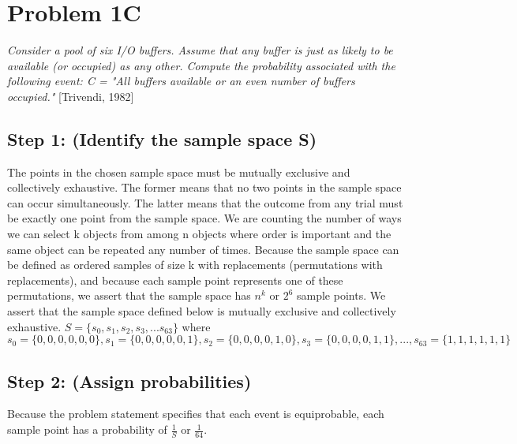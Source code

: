 \documentclass[a4paper,10pt]{article}
\title{}
\author{Mark Johnson \\
Loyola University Chicago}
\date {mjohnson4@luc.edu}
\begin{document}
\maketitle

\section{Problem 1C}
\emph{Consider a pool of six I/O buffers. Assume that any buffer is just as likely to be available (or occupied) as 
any other. Compute the probability associated with the following event: \newline
C = "All buffers available or an even number of buffers occupied."} [Trivendi, 1982]
\subsection{Step 1: (Identify the sample space S)}
The points in the chosen sample space must be mutually exclusive and collectively exhaustive. The former means that 
no two points in the sample space can occur simultaneously. The latter means that the outcome from any trial must be 
exactly one point from the sample space. We are counting the number of ways we can select k objects from among n 
objects where order is important and the same object can be repeated any number of times. Because the sample space 
can be defined as ordered samples of size k with replacements (permutations with replacements), and because each 
sample point represents one of these permutations, we assert that the sample space has $ n^{k} $ or $ 2^{6} $ sample 
points. We assert that the sample space defined below is mutually exclusive and collectively exhaustive. \newline
$ S = \{ s_{0}, s_{1}, s_{2}, s_{3},...s_{63} \} $ where \newline
$ s_{0} = \{0,0,0,0,0,0\}, s_{1} = \{0,0,0,0,0,1\}, s_{2} = \{0,0,0,0,1,0\}, s_{3} = \{0,0,0,0,1,1\},...,s_{63} = 
\{1,1,1,1,1,1\} $

\subsection{Step 2: (Assign probabilities)}
Because the problem statement specifies that each event is equiprobable, each sample point has a probability of $ 
\frac{1}{S} $ or $ \frac{1}{64} $.
\end{document}
